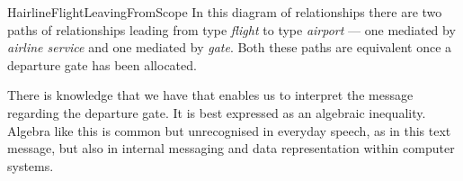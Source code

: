 \documentclass[10pt,a4paper]{article}
\newcommand{\ImagesFolder}{../images}
\begin{document}
\begin{erboxedFigure}{H}{airlineFlightLeavingFromScope}{
In this diagram of relationships there are two paths of relationships leading from 
type \textit{flight} to type \textit{airport} --- one mediated by \textit{airline service} and one mediated by \textit{gate}. Both these paths are equivalent once a departure gate has been allocated. }

\end{erboxedFigure}

There is knowledge that we have that enables us to interpret the message regarding the departure gate. 
It is best expressed as an algebraic inequality. 
Algebra like this is common but unrecognised in everyday speech, as in this text message, but also in internal messaging and data representation within computer systems. 
\end{document}

